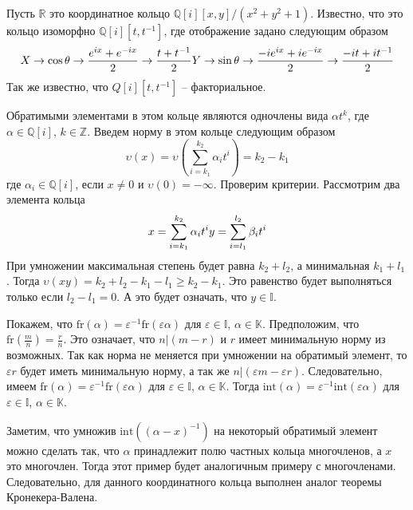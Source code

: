 \documentclass[_00_dissertation.tex]{subfiles}
\begin{document}
\begin{example}\label{example:thm1:coordinate_ring_of_circle}
	Пусть $\mathbb{R}$ это координатное кольцо $\mathbb{Q}[i][x, y]/(x^2 + y^2 + 1)$.
	Известно, что это кольцо изоморфно $\mathbb{Q}[i][t,  t^{-1}]$, где отображение задано следующим образом
	\begin{equation*}
		X \to \cos \theta \to \frac{e^{ix} + e^{-ix}}{2} \to \frac{t + t^{-1}}{2}\\
		Y \to \sin \theta \to \frac{-ie^{ix} + ie^{-ix}}{2} \to \frac{-it + it^{-1}}{2}
	\end{equation*}
	Так же известно, что $Q[i][t, t^{-1}]$ -- факториальное.
	
	Обратимыми элементами в этом кольце  являются одночлены вида $\alpha t^k$, где $\alpha\in\mathbb{Q}[i]$, $k\in\mathbb{Z}$.
	Введем норму в этом кольце следующим образом
	\begin{equation*}
		 \upsilon(x) = \upsilon\left(
		 	\sum_{i=k_1}^{k_2} \alpha_i t^i
		 \right) = k_2 - k_1
	\end{equation*}
    где $\alpha_i\in\mathbb{Q}[i]$, если $x \neq 0$ и $\upsilon(0) = -\infty$.
    Проверим критерии.
    Рассмотрим два элемента кольца
    \begin{equation*}
    	x = \sum_{i=k_1}^{k_2} \alpha_i t^i\\
    	y = \sum_{i=l_1}^{l_2} \beta_i t^i
    \end{equation*}
	При  умножении максимальная степень будет равна $k_2 + l_2$, а минимальная $k_1 + l_1$.
	Тогда $\upsilon(xy) = k_2 + l_2 - k_1 - l_1 \ge k_2 - k_1$.
	Это равенство будет выполняться только если $l_2 - l_1 = 0$.
	А это будет означать, что $y\in\mathbb{I}$.
	
	Покажем, что $\textrm{fr}(\alpha) = \varepsilon^{-1}\textrm{fr}(\varepsilon\alpha)$ для $\varepsilon\in\mathbb{I}$, $\alpha\in\mathbb{K}$.
	Предположим, что $\textrm{fr}\left(\frac{m}{n}\right) = \frac{r}{n}$.
	Это означает, что $n | (m-r)$ и $r$ имеет минимальную норму из возможных.
	Так как норма не меняется при умножении на обратимый элемент, то $\varepsilon r$ будет иметь минимальную норму, а так же $n | (\varepsilon m - \varepsilon r)$.
	Следовательно, имеем $\textrm{fr}(\alpha) = \varepsilon^{-1}\textrm{fr}(\varepsilon\alpha)$ для $\varepsilon\in\mathbb{I}$, $\alpha\in\mathbb{K}$.
	Тогда $\textrm{int}(\alpha) = \varepsilon^{-1}\textrm{int}(\varepsilon\alpha)$ для $\varepsilon\in\mathbb{I}$, $\alpha\in\mathbb{K}$.
	
	Заметим, что умножив $\textrm{int}((\alpha-x)^{-1})$ на некоторый обратимый элемент можно сделать так, что $\alpha$ принадлежит полю частных кольца многочленов, а $x$ это многочлен.
	Тогда этот пример будет аналогичным примеру с многочленами.
	Следовательно, для данного координатного кольца выполнен аналог теоремы Кронекера-Валена.
\end{example}
\end{document}
